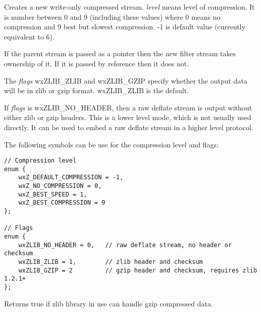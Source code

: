 
\label{wxzliboutputstreamwxzliboutputstream}



Creates a new write-only compressed stream. {\it level} means level of 
compression. It is number between 0 and 9 (including these values) where
0 means no compression and 9 best but slowest compression. -1 is default
value (currently equivalent to 6).

If the parent stream is passed as a pointer then the new filter stream
takes ownership of it. If it is passed by reference then it does not.

The {\it flags} wxZLIB\_ZLIB and wxZLIB\_GZIP specify whether the output data
will be in zlib or gzip format. wxZLIB\_ZLIB is the default.

If {\it flags} is wxZLIB\_NO\_HEADER, then a raw deflate stream is output
without either zlib or gzip headers. This is a lower level
mode, which is not usually used directly. It can be used to embed a raw
deflate stream in a higher level protocol.

The following symbols can be use for the compression level and flags:

\begin{verbatim}
// Compression level
enum {
    wxZ_DEFAULT_COMPRESSION = -1,
    wxZ_NO_COMPRESSION = 0,
    wxZ_BEST_SPEED = 1,
    wxZ_BEST_COMPRESSION = 9
};

// Flags
enum {
    wxZLIB_NO_HEADER = 0,   // raw deflate stream, no header or checksum
    wxZLIB_ZLIB = 1,        // zlib header and checksum
    wxZLIB_GZIP = 2         // gzip header and checksum, requires zlib 1.2.1+
};
\end{verbatim}

\label{wxoutputstreamcanhandlegzip}


Returns true if zlib library in use can handle gzip compressed data.

